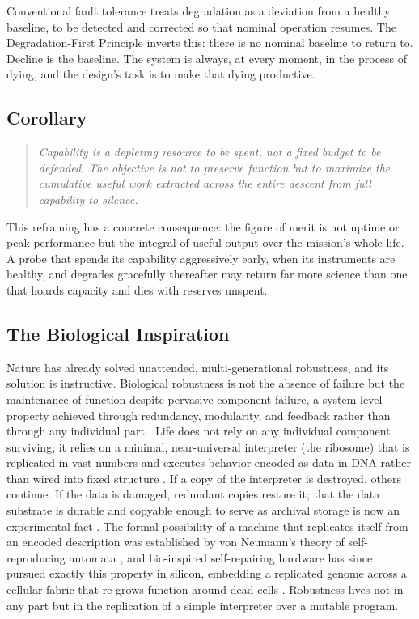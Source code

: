 \documentclass[10pt, a4paper]{article}
\begin{document}
Conventional fault tolerance treats degradation as a deviation from a healthy baseline, to be detected and corrected so that nominal operation resumes. The Degradation-First Principle inverts this: there is no nominal baseline to return to. Decline is the baseline. The system is always, at every moment, in the process of dying, and the design's task is to make that dying productive.

\subsection{Corollary}

\begin{quote}
\textit{Capability is a depleting resource to be spent, not a fixed budget to be defended. The objective is not to preserve function but to maximize the cumulative useful work extracted across the entire descent from full capability to silence.}
\end{quote}

This reframing has a concrete consequence: the figure of merit is not uptime or peak performance but the integral of useful output over the mission's whole life. A probe that spends its capability aggressively early, when its instruments are healthy, and degrades gracefully thereafter may return far more science than one that hoards capacity and dies with reserves unspent.

\subsection{The Biological Inspiration}

Nature has already solved unattended, multi-generational robustness, and its solution is instructive. Biological robustness is not the absence of failure but the maintenance of function despite pervasive component failure, a system-level property achieved through redundancy, modularity, and feedback rather than through any individual part \cite{kitano2004}. Life does not rely on any individual component surviving; it relies on a minimal, near-universal interpreter (the ribosome) that is replicated in vast numbers and executes behavior encoded as data in DNA rather than wired into fixed structure \cite{alberts2014}. If a copy of the interpreter is destroyed, others continue. If the data is damaged, redundant copies restore it; that the data substrate is durable and copyable enough to serve as archival storage is now an experimental fact \cite{church2012, goldman2013}. The formal possibility of a machine that replicates itself from an encoded description was established by von Neumann's theory of self-reproducing automata \cite{vonneumann1966}, and bio-inspired self-repairing hardware has since pursued exactly this property in silicon, embedding a replicated genome across a cellular fabric that re-grows function around dead cells \cite{mange2000}. Robustness lives not in any part but in the replication of a simple interpreter over a mutable program.
\end{document}
